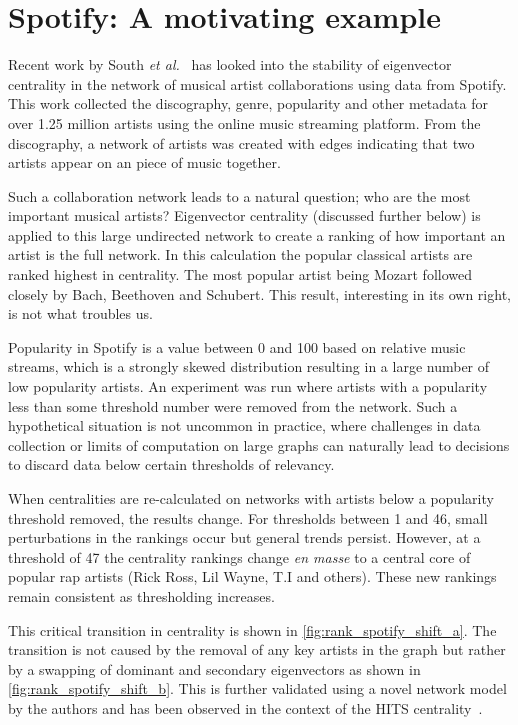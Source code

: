 \section{Spotify: A motivating example}

Recent work by South \emph{et al.}~\cite{south_centrality_2021} has looked into the stability of eigenvector centrality in the network of musical artist collaborations using data from Spotify. This work collected the discography, genre, popularity and other metadata for over 1.25 million artists using the online music streaming platform. From the discography, a network of artists was created with edges indicating that two artists appear on an piece of music together. 

Such a collaboration network leads to a natural question; who are the most important musical artists? Eigenvector centrality (discussed further below) is applied to this large undirected network to create a ranking of how important an artist is the full network. In this calculation the popular classical artists are ranked highest in centrality. The most popular artist being Mozart followed closely by Bach, Beethoven and Schubert. This result, interesting in its own right, is not what troubles us.

Popularity in Spotify is a value between 0 and 100 based on relative music streams, which is a strongly skewed distribution resulting in a large number of low popularity artists. An experiment was run where artists with a popularity less than some threshold number were removed from the network.  Such a hypothetical situation is not uncommon in practice, where challenges in data collection or limits of computation on large graphs can naturally lead to decisions to discard data below certain thresholds of relevancy.

When centralities are re-calculated on networks with artists below a popularity threshold removed, the results change. For thresholds between 1 and 46, small perturbations in the rankings occur but general trends persist. However, at a threshold of 47 the centrality rankings change {\em en masse} to a central core of popular rap artists (Rick Ross, Lil Wayne, T.I and others). These new rankings remain consistent as thresholding increases.

This critical transition in centrality is shown in \autoref{fig:rank_spotify_shift_a}. The transition is not caused by the removal of any key artists in the graph but rather by a swapping of dominant and secondary eigenvectors as shown in \autoref{fig:rank_spotify_shift_b}. This is further validated using a novel network model by the authors and has been observed in the context of the HITS centrality~\cite{ng_link_2001}.


